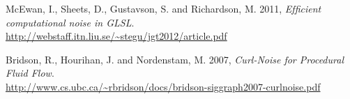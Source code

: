 \documentclass[report]{vgtc}
\begin{document}
\begin{thebibliography}{9}
  McEwan, I., Sheets, D., Gustavson, S. and Richardson, M. 2011,
  \emph{Efﬁcient computational noise in GLSL}.\\
\url{http://webstaff.itn.liu.se/~stegu/jgt2012/article.pdf}

  Bridson, R., Hourihan, J. and Nordenstam, M. 2007,
  \emph{Curl-Noise for Procedural Fluid Flow}.\\
\url{http://www.cs.ubc.ca/~rbridson/docs/bridson-siggraph2007-curlnoise.pdf}
\end{thebibliography}
\end{document}
